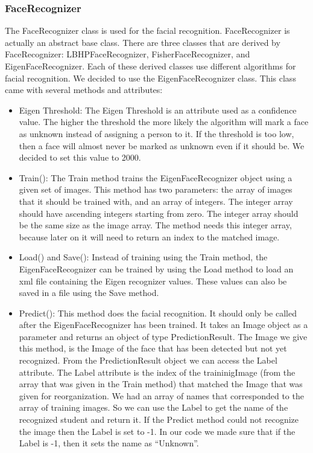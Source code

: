 \documentclass[12pt, a4paper]{article}
\begin{document}
\subsubsection{FaceRecognizer} The FaceRecognizer class is used for the facial recognition. FaceRecognizer is actually an abstract base class. There are three classes that are derived by FaceRecognizer: LBHPFaceRecognizer, FisherFaceRecognizer, and EigenFaceRecognizer. Each of these derived classes use different algorithms for facial recognition. We decided to use the EigenFaceRecognizer class. This class came with several methods and attributes:
\begin{itemize}
\item Eigen Threshold: The Eigen Threshold is an attribute used as a confidence value. The higher the threshold the more likely the algorithm will mark a face as unknown instead of assigning a person to it. If the threshold is too low, then a face will almost never be marked as unknown even if it should be. We decided to set this value to 2000. 
\item Train(): The Train method trains the EigenFaceRecognizer object using a given set of images. This method has two parameters: the array of images that it should be trained with, and an array of integers. The integer array should have ascending integers starting from zero. The integer array should be the same size as the image array. The method needs this integer array, because later on it will need to return an index to the matched image.
\item Load() and Save(): Instead of training using the Train method, the EigenFaceRecognizer can be trained by using the Load method to load an xml file containing the Eigen recognizer values. These values can also be saved in a file using the Save method.
\item Predict(): This method does the facial recognition. It should only be called after the EigenFaceRecognizer has been trained. It takes an Image object as a parameter and returns an object of type PredictionResult. The Image we give this method, is the Image of the face that has been detected but not yet recognized. From the PredictionResult object we can access the Label attribute. The Label attribute is the index of the traininigImage (from the array that was given in the Train method) that matched the Image that was given for reorganization. We had an array of names that corresponded to the array of training images. So we can use the Label to get the name of the recognized student and return it. If the Predict method could not recognize the image then the Label is set to -1. In our code we made sure that if the Label is -1, then it sets the name as “Unknown”.
\end{itemize}
\end{document}
